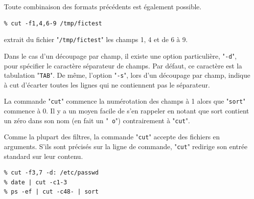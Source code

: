 Toute combinaison des formats pr{\'e}c{\'e}dents est {\'e}galement possible.

\begin{example}
\begin{verbatim}
% cut -f1,4,6-9 /tmp/fictest
\end{verbatim}
extrait du fichier "{\tt /tmp/fictest}" les champs 1, 4 et de 6 {\`a} 9.
\end{example}

Dans le cas d'un d{\'e}coupage par champ, il existe une option particuli{\`e}re,
"{\tt -d}", pour sp{\'e}cifier le caract{\`e}re s{\'e}parateur de champs. Par
d{\'e}faut, ce caract{\`e}re est la tabulation "{\tt TAB}". De m{\^e}me,
l'option "{\tt -s}", lors d'un d{\'e}coupage par champ, indique {\`a} cut
d'{\'e}carter toutes les lignes qui ne contiennent pas le s{\'e}parateur.

\begin{remarque}
La commande "{\tt cut}" commence la num{\'e}rotation des champs {\`a} 1 alors
que "{\tt sort}" commence {\`a} 0. Il y a un moyen facile de s'en rappeler
en notant que sort contient un z{\'e}ro dans son nom (en fait un "{\tt
o}") contrairement {\`a} "{\tt cut}".
\end{remarque}

Comme la plupart des filtres, la commande "{\tt cut}" accepte des
fichiers en arguments. S'ils sont pr{\'e}cis{\'e}s sur la ligne de commande,
"{\tt cut}" redirige son entr{\'e}e standard sur leur contenu.

\begin{example}
\begin{verbatim}
% cut -f3,7 -d: /etc/passwd
% date | cut -c1-3
% ps -ef | cut -c48- | sort
\end{verbatim}
\end{example}

